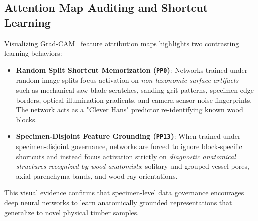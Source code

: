 \subsection{Attention Map Auditing and Shortcut Learning}
Visualizing Grad-CAM~\cite{gradcam} feature attribution maps highlights two contrasting learning behaviors:
\begin{itemize}
\item \textbf{Random Split Shortcut Memorization (\texttt{PP0})}: Networks trained under random image splits focus activation on \emph{non-taxonomic surface artifacts}---such as mechanical saw blade scratches, sanding grit patterns, specimen edge borders, optical illumination gradients, and camera sensor noise fingerprints. The network acts as a "Clever Hans" predictor re-identifying known wood blocks.
\item \textbf{Specimen-Disjoint Feature Grounding (\texttt{PP13})}: When trained under specimen-disjoint governance, networks are forced to ignore block-specific shortcuts and instead focus activation strictly on \emph{diagnostic anatomical structures recognized by wood anatomists}: solitary and grouped vessel pores, axial parenchyma bands, and wood ray orientations.
\end{itemize}

This visual evidence confirms that specimen-level data governance encourages deep neural networks to learn anatomically grounded representations that generalize to novel physical timber samples.
